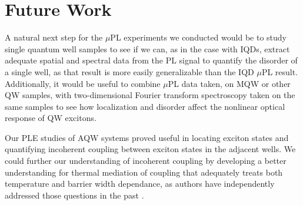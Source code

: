 \section{Future Work}
\indent A natural next step for the $\mu$PL experiments we conducted would be to study single quantum well samples to see if we can, as in the case with IQDs, extract adequate spatial and spectral data from the PL signal to quantify the disorder of a single well, as that result is more easily generalizable than the IQD $\mu$PL result. Additionally, it would be useful to combine $\mu$PL data taken, on MQW or other QW samples, with two-dimensional Fourier transform spectroscopy taken on the same samples to see how localization and disorder affect the nonlinear optical response of QW excitons.

\indent Our PLE studies of AQW systems proved useful in locating exciton states and quantifying incoherent coupling between exciton states in the adjacent wells. We could further our understanding of incoherent coupling by developing a better understanding for thermal mediation of coupling that adequately treats both temperature and barrier width dependance, as authors have independently addressed those questions in the past \cite{borri, batsch, tomita}.
